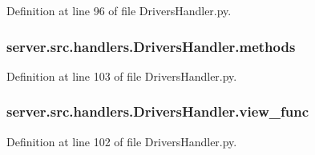 Definition at line 96 of file Drivers\+Handler.\+py.

\subsubsection[{\texorpdfstring{methods}{methods}}]{\setlength{\rightskip}{0pt plus 5cm}server.\+src.\+handlers.\+Drivers\+Handler.\+methods}\hypertarget{namespaceserver_1_1src_1_1handlers_1_1_drivers_handler_a3634d5c3f882ab668da5e543eaec9be9}{}\label{namespaceserver_1_1src_1_1handlers_1_1_drivers_handler_a3634d5c3f882ab668da5e543eaec9be9}


Definition at line 103 of file Drivers\+Handler.\+py.

\subsubsection[{\texorpdfstring{view\+\_\+func}{view_func}}]{\setlength{\rightskip}{0pt plus 5cm}server.\+src.\+handlers.\+Drivers\+Handler.\+view\+\_\+func}\hypertarget{namespaceserver_1_1src_1_1handlers_1_1_drivers_handler_af37c168b94ff719ffb324453c5c1cd06}{}\label{namespaceserver_1_1src_1_1handlers_1_1_drivers_handler_af37c168b94ff719ffb324453c5c1cd06}


Definition at line 102 of file Drivers\+Handler.\+py.

